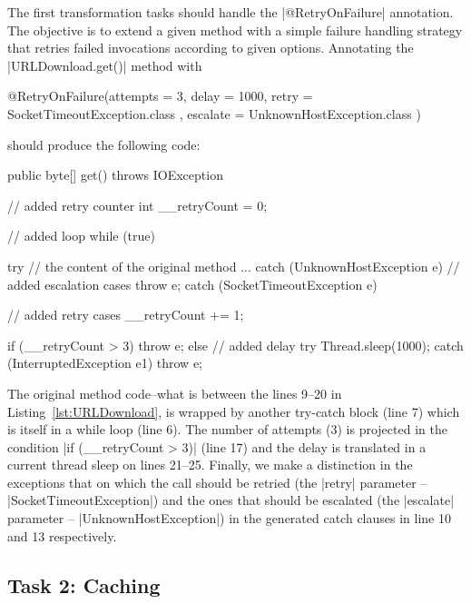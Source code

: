 The first transformation tasks should handle the \javainline|@RetryOnFailure| annotation.
The objective is to extend a given method with a simple failure handling strategy that retries failed invocations according to given options.
Annotating the \javainline|URLDownload.get()| method with
%
\begin{javacode}
@RetryOnFailure(attempts = 3, delay = 1000, retry = { SocketTimeoutException.class }, escalate = { UnknownHostException.class })
\end{javacode}
%
should produce the following code:
%
\begin{javacode}
public byte[] get() throws IOException {
  // added retry counter 
  int __retryCount = 0;

  // added loop
  while (true) {
    try {
      // the content of the original method
      ...
    } catch (UnknownHostException e) {
      // added escalation cases
      throw e;
    } catch (SocketTimeoutException e) {
      // added retry cases
      __retryCount += 1;

      if (__retryCount > 3) {
        throw e;
      } else {
        // added delay 
        try {
          Thread.sleep(1000);
        } catch (InterruptedException e1) {
          throw e;
        }
      }
    }
  }
}
\end{javacode}

The original method code--\Ie what is between the lines 9--20 in Listing~\ref{lst:URLDownload}, is wrapped by another try-catch block (line 7) which is itself in a while loop (line 6).
The number of attempts (3) is projected in the condition \javainline|if (__retryCount > 3)| (line 17) and the delay is translated in a current thread sleep on lines 21--25.
Finally, we make a distinction in the exceptions that on which the call should be retried (the \javainline|retry| parameter -- \javainline|SocketTimeoutException|) and the ones that should be escalated (the \javainline|escalate| parameter -- \javainline|UnknownHostException|) in the generated catch clauses in line 10 and 13 respectively.

\subsection{Task 2: Caching}

